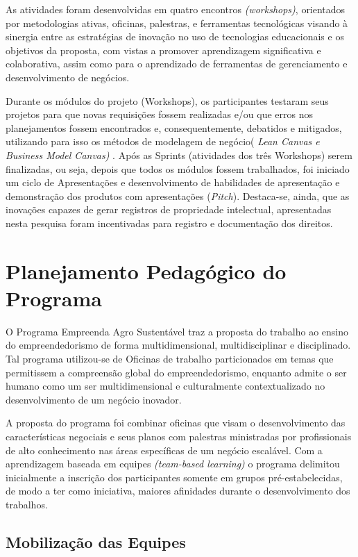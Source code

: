 As atividades foram desenvolvidas em quatro encontros \textit{(workshops)}, orientados por metodologias ativas, oficinas, palestras, e ferramentas tecnológicas visando à sinergia entre as estratégias de inovação no uso de tecnologias educacionais e os objetivos da proposta, com vistas a promover aprendizagem significativa e colaborativa, assim como para o aprendizado de ferramentas de gerenciamento e desenvolvimento de negócios.

Durante os módulos do projeto (Workshops), os participantes testaram seus projetos para que novas requisições fossem realizadas e/ou que erros nos planejamentos fossem encontrados e, consequentemente, debatidos e mitigados, utilizando para isso os métodos de modelagem de negócio( \textit{Lean Canvas e Business Model Canvas)} . Após as Sprints (atividades dos três Workshops) serem finalizadas, ou seja, depois que todos os módulos fossem trabalhados, foi iniciado um ciclo de Apresentações e desenvolvimento de habilidades de apresentação e demonstração dos produtos com apresentações (\textit{Pitch}). Destaca-se, ainda, que as inovações capazes de gerar registros de propriedade intelectual, apresentadas nesta pesquisa foram incentivadas para registro e documentação dos direitos.


\section{Planejamento Pedagógico do Programa}

O Programa Empreenda Agro Sustentável traz a proposta do trabalho ao ensino do empreendedorismo de forma multidimensional, multidisciplinar e disciplinado. Tal programa utilizou-se de Oficinas de trabalho particionados em temas que permitissem a compreensão global do empreendedorismo, enquanto admite o ser humano como um ser multidimensional e culturalmente contextualizado no desenvolvimento de um negócio inovador.

A proposta do programa foi combinar oficinas que visam o desenvolvimento das características negociais e seus planos com palestras ministradas por profissionais de alto conhecimento nas áreas específicas de um negócio escalável. Com a aprendizagem baseada em equipes \textit{(team-based learning)} o programa delimitou inicialmente a inscrição dos participantes somente em grupos pré-estabelecidas, de modo a ter como iniciativa, maiores afinidades durante o desenvolvimento dos trabalhos.


\subsection{Mobilização das Equipes}

